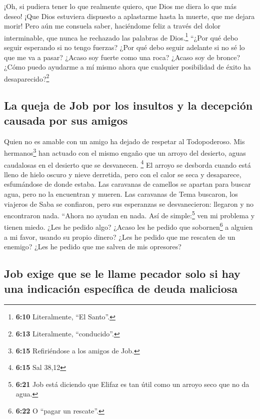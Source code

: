  ¡Oh, si pudiera tener lo que realmente quiero, que Dios
me diera lo que más deseo!  ¡Que Dios estuviera dispuesto
a aplastarme hasta la muerte, que me dejara morir!  Pero
aún me consuela saber, haciéndome feliz a través del dolor interminable,
que nunca he rechazado las palabras de Dios.\footnote{\textbf{6:10}
  Literalmente, ``El Santo''.}  ``¿Por qué debo seguir
esperando si no tengo fuerzas? ¿Por qué debo seguir adelante si no sé lo
que me va a pasar?  ¿Acaso soy fuerte como una roca?
¿Acaso soy de bronce?  ¿Cómo puedo ayudarme a mí mismo
ahora que cualquier posibilidad de éxito ha desaparecido?\footnote{\textbf{6:13}
  Literalmente, ``conducido''.}

\hypertarget{la-queja-de-job-por-los-insultos-y-la-decepciuxf3n-causada-por-sus-amigos}{%
\subsection{La queja de Job por los insultos y la decepción causada por
sus
amigos}\label{la-queja-de-job-por-los-insultos-y-la-decepciuxf3n-causada-por-sus-amigos}}

 Quien no es amable con un amigo ha dejado de respetar al
Todopoderoso.  Mis hermanos\footnote{\textbf{6:15}
  Refiriéndose a los amigos de Job.} han actuado con el mismo engaño que
un arroyo del desierto, aguas caudalosas en el desierto que se
desvanecen. \footnote{\textbf{6:15} Sal 38,12}  El arroyo
se desborda cuando está lleno de hielo oscuro y nieve derretida,
 pero con el calor se seca y desaparece, esfumándose de
donde estaba.  Las caravanas de camellos se apartan para
buscar agua, pero no la encuentran y mueren.  Las
caravanas de Tema buscaron, los viajeros de Saba se confiaron,
 pero sus esperanzas se desvanecieron: llegaron y no
encontraron nada.  ``Ahora no ayudan en nada. Así de
simple:\footnote{\textbf{6:21} Job está diciendo que Elifaz es tan útil
  como un arroyo seco que no da agua.} ven mi problema y tienen miedo.
 ¿Les he pedido algo? ¿Acaso les he pedido que
sobornen\footnote{\textbf{6:22} O ``pagar un rescate''.} a alguien a mi
favor, usando su propio dinero?  ¿Les he pedido que me
rescaten de un enemigo? ¿Les he pedido que me salven de mis opresores?

\hypertarget{job-exige-que-se-le-llame-pecador-solo-si-hay-una-indicaciuxf3n-especuxedfica-de-deuda-maliciosa}{%
\subsection{Job exige que se le llame pecador solo si hay una indicación
específica de deuda
maliciosa}\label{job-exige-que-se-le-llame-pecador-solo-si-hay-una-indicaciuxf3n-especuxedfica-de-deuda-maliciosa}}

